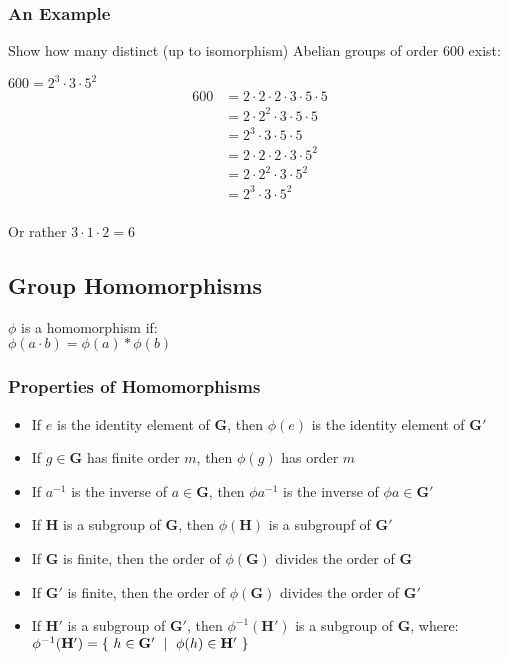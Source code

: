 \documentclass{article}
\begin{document}
  \subsubsection{An Example}

  Show how many distinct (up to isomorphism) Abelian groups of order 600 exist:

  $600 = 2^3 \cdot 3 \cdot 5^2$ \\
  \begin{align*}
    600 & = 2 \cdot 2 \cdot 2\cdot 3 \cdot 5 \cdot 5  \\
        & = 2 \cdot 2^2 \cdot 3 \cdot 5 \cdot 5       \\
        & = 2^3 \cdot 3 \cdot 5 \cdot 5               \\
        & = 2 \cdot 2 \cdot 2\cdot 3 \cdot 5^2        \\
        & = 2 \cdot 2^2 \cdot 3 \cdot 5^2             \\
        & = 2^3 \cdot 3 \cdot 5^2                     \\
  \end{align*}

  Or rather $3 \cdot 1 \cdot 2 = 6$

  \pagebreak
  \subsection{Group Homomorphisms}
  \label{sub-group-homomorphisms}

  $\phi$ is a homomorphism if: \\
  $\phi(a \cdot b) = \phi(a)\ast\phi(b)$

  \subsubsection{Properties of Homomorphisms}

  \begin{itemize}
    \item If $e$ is the identity element of $\mathbf{G}$, then $\phi(e)$ is the identity element of $\mathbf{G}'$
    \item If $g \in \mathbf{G}$ has finite order $m$, then $\phi(g)$ has order $m$
    \item If $a^{-1}$ is the inverse of $a \in \mathbf{G}$, then $\phi{a^{-1}}$ is the inverse of $\phi{a}\in\mathbf{G}'$
    \item If $\mathbf{H}$ is a subgroup of $\mathbf{G}$, then $\phi(\mathbf{H})$ is a subgroupf of $\mathbf{G}'$
    \item If $\mathbf{G}$ is finite, then the order of $\phi(\mathbf{G})$ divides the order of $\mathbf{G}$
    \item If $\mathbf{G}'$ is finite, then the order of $\phi(\mathbf{G})$ divides the order of $\mathbf{G}'$
    \item
      If $\mathbf{H}'$ is a subgroup of $\mathbf{G}'$, then $\phi^{-1}(\mathbf{H}')$ is a subgroup of $\mathbf{G}$, where: \\
      $\phi^{-1}(\mathbf{H}') = \{\ h \in \mathbf{G}'\ \mid\ \phi(h) \in \mathbf{H}'\ \}$
  \end{itemize}
\end{document}
